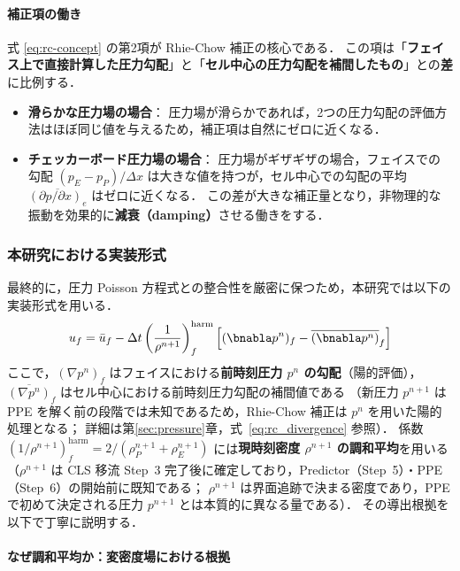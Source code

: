 \paragraph{補正項の働き}
式 \eqref{eq:rc-concept} の第2項が Rhie-Chow 補正の核心である．
この項は「\textbf{フェイス上で直接計算した圧力勾配}」と「\textbf{セル中心の圧力勾配を補間したもの}」との\textbf{差}に比例する．
\begin{itemize}
    \item \textbf{滑らかな圧力場の場合}：
    圧力場が滑らかであれば，2つの圧力勾配の評価方法はほぼ同じ値を与えるため，補正項は自然にゼロに近くなる．
    \item \textbf{チェッカーボード圧力場の場合}：
    圧力場がギザギザの場合，フェイスでの勾配 $(p_E-p_P)/\Delta x$ は大きな値を持つが，セル中心での勾配の平均 $\overline{(\partial p/\partial x)_e}$ はゼロに近くなる．
    この差が大きな補正量となり，非物理的な振動を効果的に\textbf{減衰（damping）}させる働きをする．
\end{itemize}

\subsubsection{本研究における実装形式}
\label{sec:rc_implementation}
最終的に，圧力 Poisson 方程式との整合性を厳密に保つため，本研究では以下の実装形式を用いる．
\begin{equation}
 u_f = \bar{u}_f - \Delta t\left( \frac{1}{\rho^{n+1}} \right)^{\mathrm{harm}}_f \left[ (\bnabla p^n)_f - \overline{(\bnabla p^n)}_f \right]
 \label{eq:rc-face}
\end{equation}
ここで，$(\nabla p^n)_f$ はフェイスにおける\textbf{前時刻圧力 $p^n$ の勾配}（陽的評価），
$\overline{(\nabla p^n)}_f$ はセル中心における前時刻圧力勾配の補間値である
（新圧力 $p^{n+1}$ は PPE を解く前の段階では未知であるため，Rhie-Chow 補正は $p^n$ を用いた陽的処理となる；
詳細は第\ref{sec:pressure}章，式~\eqref{eq:rc_divergence} 参照）．
係数 $(1/\rho^{n+1})_f^\mathrm{harm} = 2/(\rho^{n+1}_P + \rho^{n+1}_E)$ には\textbf{現時刻密度 $\rho^{n+1}$ の調和平均}を用いる
（$\rho^{n+1}$ は CLS 移流 Step~3 完了後に確定しており，Predictor（Step~5）・PPE（Step~6）の開始前に既知である；
$\rho^{n+1}$ は界面追跡で決まる密度であり，PPE で初めて決定される圧力 $p^{n+1}$ とは本質的に異なる量である）．
その導出根拠を以下で丁寧に説明する．

\paragraph{なぜ調和平均か：変密度場における根拠}

